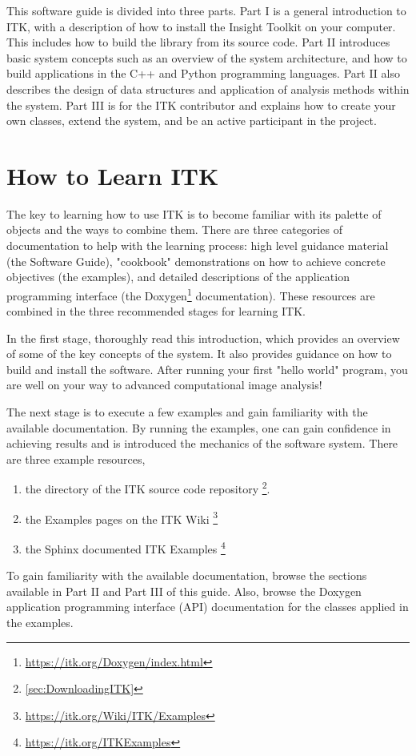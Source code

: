 This software guide is divided into three parts. Part I is a general
introduction to ITK, with a description of how to install the Insight
Toolkit on your computer. This includes how to build the library from its
source code. Part II introduces basic system concepts such as an overview of
the system architecture, and how to build applications in the C++ and Python
programming languages. Part II also describes the design of data structures
and application of analysis methods within the system.  Part III is for the
ITK contributor and explains how to create your own classes, extend the
system, and be an active participant in the project.

\section{How to Learn ITK}
\label{sec:HowToLearnITK}

The key to learning how to use ITK is to become familiar with its palette of
objects and the ways to combine them. There are three categories of
documentation to help with the learning process: high level guidance material
(the Software Guide), "cookbook" demonstrations on how to achieve concrete
objectives (the examples), and detailed descriptions of the
application programming interface (the
Doxygen\footnote{\url{https://itk.org/Doxygen/index.html}} documentation). These
resources are combined in the three recommended stages for learning ITK.

In the first stage, thoroughly read this introduction, which provides an
overview of some of the key concepts of the system. It also provides guidance
on how to build and install the software. After running your first "hello
world" program, you are well on your way to advanced computational image
analysis!

The next stage is to execute a few examples and gain familiarity with the
available documentation. By running the examples, one can gain confidence
in achieving results and is introduced the mechanics of the software system.
There are three example resources,
\begin{enumerate}
  \item the  directory of the ITK source code repository \footnote{\ref{sec:DownloadingITK}}.
  \item the Examples pages on the ITK Wiki \footnote{\url{https://itk.org/Wiki/ITK/Examples}}
  \item the Sphinx documented ITK Examples \footnote{\url{https://itk.org/ITKExamples}}
\end{enumerate}
To gain familiarity with the available documentation, browse the sections
available in Part II and Part III of this guide. Also, browse the Doxygen
application programming interface (API) documentation for the classes applied
in the examples.

